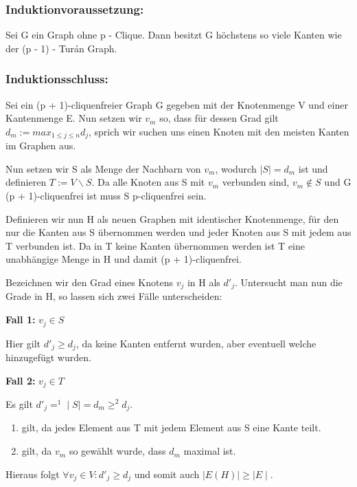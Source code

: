 \documentclass[12pt, a4paper]{article}
\begin{document}
\subsubsection{Induktionvoraussetzung:}

Sei G ein Graph ohne p - Clique. Dann besitzt G höchstens so viele Kanten wie der (p - 1) - Turán Graph.

\subsubsection{Induktionsschluss:}

Sei ein (p + 1)-cliquenfreier Graph G gegeben mit der Knotenmenge V und einer Kantenmenge E. Nun setzen wir $v_m$ so, dass für dessen Grad gilt $d_m := max_{1 \le j \le n} d_j$, sprich wir suchen uns einen Knoten mit den meisten Kanten im Graphen aus.

Nun setzen wir S als Menge der Nachbarn von $v_m$, wodurch $\mid S \mid = d_m$ ist und definieren $T := V \backslash S$. Da alle Knoten aus S mit $v_m$ verbunden sind, $v_m \notin S$ und G (p + 1)-cliquenfrei ist muss S p-cliquenfrei sein.

Definieren wir nun H als neuen Graphen mit identischer Knotenmenge, für den nur die Kanten aus S übernommen werden und jeder Knoten aus S mit jedem aus T verbunden ist. Da in T keine Kanten übernommen werden ist T eine unabhängige Menge in H und damit (p + 1)-cliquenfrei.

Bezeichnen wir den Grad eines Knotens $v_j$ in H als $d'_j$. Untersucht man nun die Grade in H, so lassen sich zwei Fälle unterscheiden:

\textbf{Fall 1:} $v_j \in S$

Hier gilt $d'_j \ge d_j$, da keine Kanten entfernt wurden, aber eventuell welche hinzugefügt wurden.

\textbf{Fall 2:} $v_j \in T$

Es gilt $d'_j =^1 \mid S \mid = d_m \ge^2 d_j$.
\begin{enumerate}
\item {}
gilt, da jedes Element aus T mit jedem Element aus S eine Kante teilt.

\item {}
gilt, da $v_m$ so gewählt wurde, dass $d_m$ maximal ist.

\end{enumerate}

Hieraus folgt $\forall v_j \in V: d'_j \ge d_j$ und somit auch $\mid E(H) \mid \ge \mid E \mid$.
\end{document}

